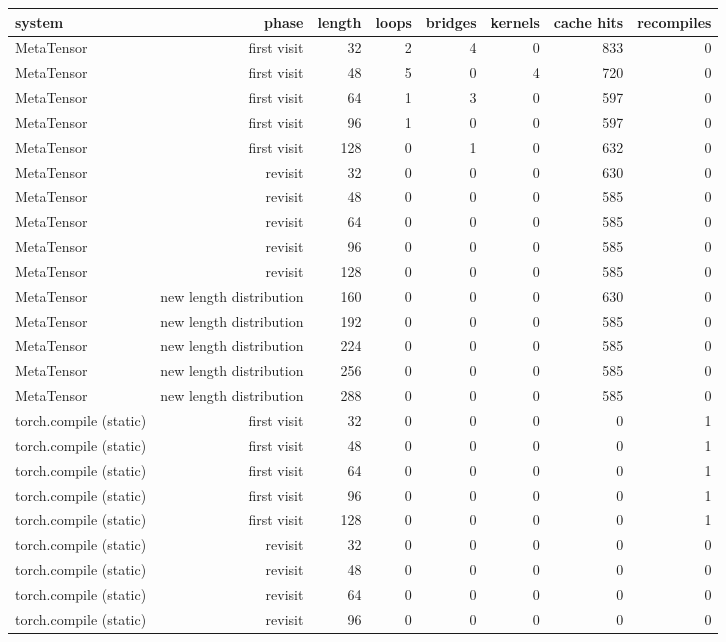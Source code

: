 \begin{tabular}{lrrrrrrr}
\toprule
system & phase & length & loops & bridges & kernels & cache hits & recompiles \\
\midrule
MetaTensor & first visit & 32 & 2 & 4 & 0 & 833 & 0 \\
MetaTensor & first visit & 48 & 5 & 0 & 4 & 720 & 0 \\
MetaTensor & first visit & 64 & 1 & 3 & 0 & 597 & 0 \\
MetaTensor & first visit & 96 & 1 & 0 & 0 & 597 & 0 \\
MetaTensor & first visit & 128 & 0 & 1 & 0 & 632 & 0 \\
MetaTensor & revisit & 32 & 0 & 0 & 0 & 630 & 0 \\
MetaTensor & revisit & 48 & 0 & 0 & 0 & 585 & 0 \\
MetaTensor & revisit & 64 & 0 & 0 & 0 & 585 & 0 \\
MetaTensor & revisit & 96 & 0 & 0 & 0 & 585 & 0 \\
MetaTensor & revisit & 128 & 0 & 0 & 0 & 585 & 0 \\
MetaTensor & new length distribution & 160 & 0 & 0 & 0 & 630 & 0 \\
MetaTensor & new length distribution & 192 & 0 & 0 & 0 & 585 & 0 \\
MetaTensor & new length distribution & 224 & 0 & 0 & 0 & 585 & 0 \\
MetaTensor & new length distribution & 256 & 0 & 0 & 0 & 585 & 0 \\
MetaTensor & new length distribution & 288 & 0 & 0 & 0 & 585 & 0 \\
torch.compile (static) & first visit & 32 & 0 & 0 & 0 & 0 & 1 \\
torch.compile (static) & first visit & 48 & 0 & 0 & 0 & 0 & 1 \\
torch.compile (static) & first visit & 64 & 0 & 0 & 0 & 0 & 1 \\
torch.compile (static) & first visit & 96 & 0 & 0 & 0 & 0 & 1 \\
torch.compile (static) & first visit & 128 & 0 & 0 & 0 & 0 & 1 \\
torch.compile (static) & revisit & 32 & 0 & 0 & 0 & 0 & 0 \\
torch.compile (static) & revisit & 48 & 0 & 0 & 0 & 0 & 0 \\
torch.compile (static) & revisit & 64 & 0 & 0 & 0 & 0 & 0 \\
torch.compile (static) & revisit & 96 & 0 & 0 & 0 & 0 & 0 \\

\end{tabular}
